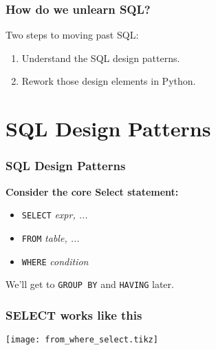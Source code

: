 \documentclass{beamer}
\begin{document}
\begin{frame}
    \frametitle{How do we unlearn SQL?}
    Two steps to moving past SQL:
    \begin{enumerate}
        \item Understand the SQL design patterns.
        \item Rework those design elements in Python.
    \end{enumerate}
\end{frame}

\section{SQL Design Patterns}
\begin{frame}
    \frametitle{SQL Design Patterns}

    \textbf{Consider the core Select statement:}

    \begin{itemize}
    \item[] \texttt{SELECT} \textit{expr, ...}

    \item[] \texttt{FROM} \textit{table, ...}

    \item[] \texttt{WHERE} \textit{condition}
    \end{itemize}

    \vspace{1em}

    We'll get to \texttt{GROUP BY} and \texttt{HAVING} later.

\end{frame}

\begin{frame}
    \frametitle{SELECT works like this}

    \begin{center}
    \texttt{[image: from\_where\_select.tikz]}
    \end{center}

\end{frame}
\end{document}
